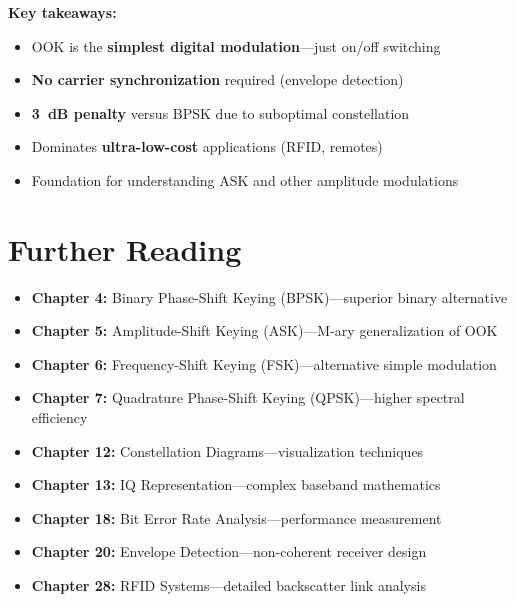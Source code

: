 \textbf{Key takeaways:}
\begin{itemize}
\item OOK is the \textbf{simplest digital modulation}---just on/off switching
\item \textbf{No carrier synchronization} required (envelope detection)
\item \textbf{3~dB penalty} versus BPSK due to suboptimal constellation
\item Dominates \textbf{ultra-low-cost} applications (RFID, remotes)
\item Foundation for understanding ASK and other amplitude modulations
\end{itemize}

\section{Further Reading}

\begin{itemize}
\item \textbf{Chapter 4:} Binary Phase-Shift Keying (BPSK)---superior binary alternative
\item \textbf{Chapter 5:} Amplitude-Shift Keying (ASK)---M-ary generalization of OOK
\item \textbf{Chapter 6:} Frequency-Shift Keying (FSK)---alternative simple modulation
\item \textbf{Chapter 7:} Quadrature Phase-Shift Keying (QPSK)---higher spectral efficiency
\item \textbf{Chapter 12:} Constellation Diagrams---visualization techniques
\item \textbf{Chapter 13:} IQ Representation---complex baseband mathematics
\item \textbf{Chapter 18:} Bit Error Rate Analysis---performance measurement
\item \textbf{Chapter 20:} Envelope Detection---non-coherent receiver design
\item \textbf{Chapter 28:} RFID Systems---detailed backscatter link analysis
\end{itemize}
